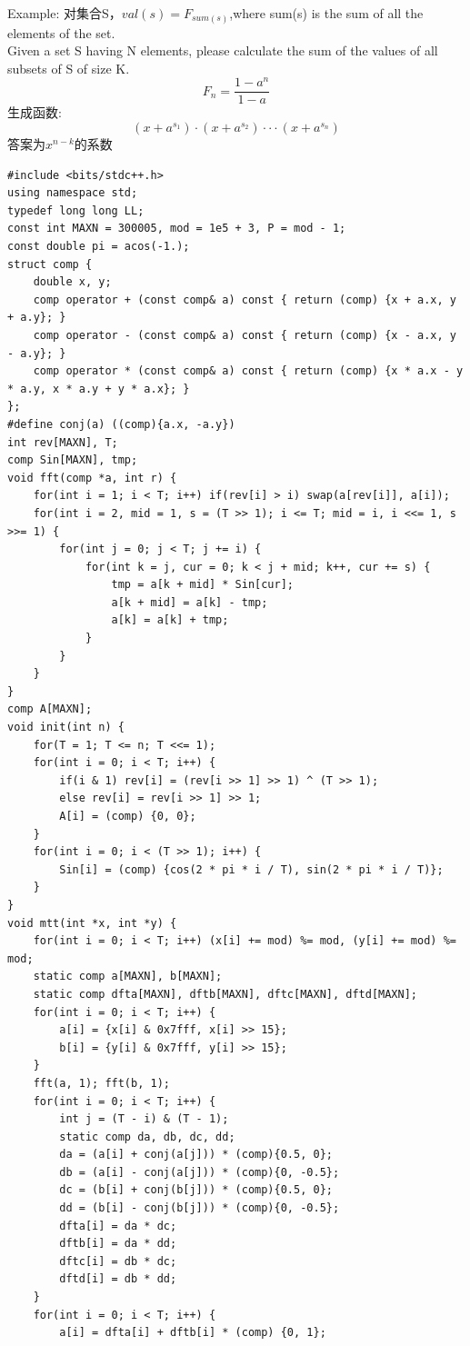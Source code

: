 \documentclass[10pt]{ctexart}
\begin{document}
{Example:
对集合S，$val(s) = F_{sum(s)}$,where sum(s) is the sum of all the elements of the set.\\
Given a set S having N elements, please calculate the sum of the values of all subsets of S of size K.\\
$$
F_n = \frac{1 - a^n}{1-a}
$$
生成函数:
$$
(x+a^{s_1}) \cdot (x+a^{s_2}) \cdot \cdot \cdot (x+a^{s_n})
$$
答案为$x^{n-k}$的系数
\begin{lstlisting}
#include <bits/stdc++.h>
using namespace std;
typedef long long LL;
const int MAXN = 300005, mod = 1e5 + 3, P = mod - 1;
const double pi = acos(-1.);
struct comp {
    double x, y;
    comp operator + (const comp& a) const { return (comp) {x + a.x, y + a.y}; }
    comp operator - (const comp& a) const { return (comp) {x - a.x, y - a.y}; }
    comp operator * (const comp& a) const { return (comp) {x * a.x - y * a.y, x * a.y + y * a.x}; }
};
#define conj(a) ((comp){a.x, -a.y})
int rev[MAXN], T;
comp Sin[MAXN], tmp;
void fft(comp *a, int r) {
    for(int i = 1; i < T; i++) if(rev[i] > i) swap(a[rev[i]], a[i]);
    for(int i = 2, mid = 1, s = (T >> 1); i <= T; mid = i, i <<= 1, s >>= 1) {
        for(int j = 0; j < T; j += i) {
            for(int k = j, cur = 0; k < j + mid; k++, cur += s) {
                tmp = a[k + mid] * Sin[cur];
                a[k + mid] = a[k] - tmp;
                a[k] = a[k] + tmp;
            }
        }
    }
}
comp A[MAXN];
void init(int n) {
    for(T = 1; T <= n; T <<= 1);
    for(int i = 0; i < T; i++) {
        if(i & 1) rev[i] = (rev[i >> 1] >> 1) ^ (T >> 1);
        else rev[i] = rev[i >> 1] >> 1;
        A[i] = (comp) {0, 0};
    }
    for(int i = 0; i < (T >> 1); i++) {
        Sin[i] = (comp) {cos(2 * pi * i / T), sin(2 * pi * i / T)};
    }
}
void mtt(int *x, int *y) {
    for(int i = 0; i < T; i++) (x[i] += mod) %= mod, (y[i] += mod) %= mod;
    static comp a[MAXN], b[MAXN];
    static comp dfta[MAXN], dftb[MAXN], dftc[MAXN], dftd[MAXN];
    for(int i = 0; i < T; i++) {
        a[i] = {x[i] & 0x7fff, x[i] >> 15};
        b[i] = {y[i] & 0x7fff, y[i] >> 15};
    }
    fft(a, 1); fft(b, 1);
    for(int i = 0; i < T; i++) {
        int j = (T - i) & (T - 1);
        static comp da, db, dc, dd;
        da = (a[i] + conj(a[j])) * (comp){0.5, 0};
        db = (a[i] - conj(a[j])) * (comp){0, -0.5};
        dc = (b[i] + conj(b[j])) * (comp){0.5, 0};
        dd = (b[i] - conj(b[j])) * (comp){0, -0.5};
        dfta[i] = da * dc;
        dftb[i] = da * dd;
        dftc[i] = db * dc;
        dftd[i] = db * dd;
    }
    for(int i = 0; i < T; i++) {
        a[i] = dfta[i] + dftb[i] * (comp) {0, 1};

\end{lstlisting}}
\end{document}
